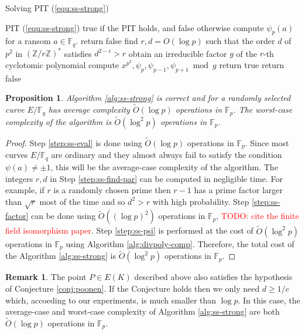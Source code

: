 \documentclass[12pt]{article}
\theoremstyle{plain}
\newtheorem{proposition}[theorem]{Proposition}
\theoremstyle{definition}
\newtheorem*{remark}{Remark}
\newcommand{\tildO}{\tilde{O}}
\newcommand{\todo}[1]{\textcolor{red}{TODO: #1}}
\def\Z{\ensuremath{\mathbb{Z}}}
\def\F{\ensuremath{\mathbb{F}}}
\begin{document}
\begin{algorithm}[H]
	\caption{Solving PIT (\ref{equ:ss-strong})}
	\label{alg:ss-strong}
	\begin{algorithmic}[1]
		\REQUIRE PIT (\ref{equ:ss-strong})
		\ENSURE true if the PIT holds, and false otherwise
		\STATE\label{step:ss-eval}
		compute $\psi_p(a)$ for a ransom $a \in \F_q$.
			\STATE return false
		\ENDIF
		\STATE\label{step:ss-find-par}
		find $r, d = O(\log p)$ such that the order $d$ of $p^2$ in $(\Z/r\Z)^*$ satisfies $d^{2 - 
		\epsilon} > r$
		\STATE\label{step:ss-factor}
		obtain an irreducible factor $g$ of the $r$-th cyclotomic polynomial
		\STATE\label{step:ss-psi}
		compute $x^{p^2}, \psi_p, \psi_{p - 1}, \psi_{p + 1} \bmod g$
			\STATE return true
		\ELSE
			\STATE return false
		\ENDIF
	\end{algorithmic}
\end{algorithm}

\begin{proposition}
	\label{prop:ss-strong}
	Algorithm \ref{alg:ss-strong} is correct and for a randomly selected curve $E/\F_q$ has average 
	complexity $\tildO(\log p)$ operations in $\F_p$. The worst-case complexity of the algorithm is 
	$\tildO(\log^2 p)$ operations in $\F_p$.
\end{proposition}
\begin{proof}
	Step \ref{step:ss-eval} is done using $\tildO(\log p)$ operations in $\F_p$. Since most curves 
	$E/\F_q$ are ordinary and they almost always fail to satisfy the condition $\psi(a) \ne \pm 1$, 
	this will be the average-case complexity of the algorithm. The integers $r, d$ in Step 
	\ref{step:ss-find-par} can be computed in negligible time. For example, if $r$ is a randomly 
	chosen prime then $r - 1$ has a prime factor larger than $\sqrt{r}$ most of the time and so 
	$d^2 > r$ with high probability. Step \ref{step:ss-factor} can be done using $\tildO((\log 
	p)^2)$ operations in $\F_p$, \todo{cite the finite field isomorphism paper}. Step 
	\ref{step:ss-psi} is performed at the cost of $\tildO(\log^2 p)$ operations in $\F_p$ using 
	Algorithm \ref{alg:divpoly-comp}. Therefore, the total cost of the Algorithm 
	\ref{alg:ss-strong} is $\tildO(\log^2 p)$ operations in $\F_p$.
\end{proof}

\begin{remark}
	The point $P \in E(K)$ described above also satisfies the hypothesis of Conjecture 
	\ref{conj:poonen}. If the Conjecture holds then we only need $d \ge 1 / c$ which, accoeding to 
	our experiments, is much smaller than $\log p$. In this case, the average-case and worst-case 
	complexity of Algorithm \ref{alg:ss-strong} are both $\tildO(\log p)$ operations in $\F_p$.
\end{remark}
\end{document}
